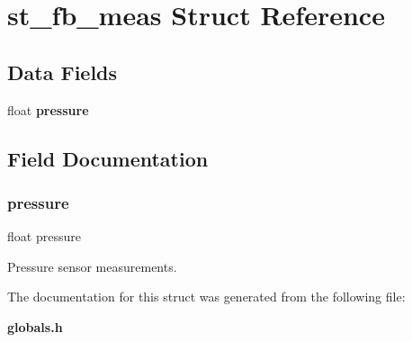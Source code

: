 \section{st\+\_\+fb\+\_\+meas Struct Reference}
\label{structst__fb__meas}
\subsection*{Data Fields}
\begin{DoxyCompactItemize}
\item 
float \textbf{ pressure}
\end{DoxyCompactItemize}


\subsection{Field Documentation}
\mbox{\label{structst__fb__meas_ac870e1249bab4a2a68cc4126761d24ef}} 
\subsubsection{pressure}
{\footnotesize\ttfamily float pressure}

Pressure sensor measurements. 

The documentation for this struct was generated from the following file\+:\begin{DoxyCompactItemize}
\item 
\textbf{ globals.\+h}\end{DoxyCompactItemize}
